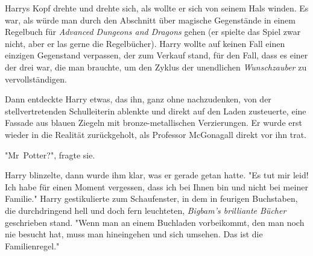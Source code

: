 Harrys Kopf drehte und drehte sich, als wollte er sich von seinem Hals winden. Es war, als würde man durch den Abschnitt über magische Gegenstände in einem Regelbuch für \emph{Advanced Dungeons and Dragons} gehen (er spielte das Spiel zwar nicht, aber er las gerne die Regelbücher). Harry wollte auf keinen Fall einen einzigen Gegenstand verpassen, der zum Verkauf stand, für den Fall, dass es einer der drei war, die man brauchte, um den Zyklus der unendlichen \emph{Wunschzauber} zu vervollständigen. 

Dann entdeckte Harry etwas, das ihn, ganz ohne nachzudenken, von der stellvertretenden Schulleiterin ablenkte und direkt auf den Laden zusteuerte, eine Fassade aus blauen Ziegeln mit bronze-metallischen Verzierungen. Er wurde erst wieder in die Realität zurückgeholt, als Professor McGonagall direkt vor ihn trat.

"Mr~Potter?", fragte sie. 

Harry blinzelte, dann wurde ihm klar, was er gerade getan hatte. "Es tut mir leid! Ich habe für einen Moment vergessen, dass ich bei Ihnen bin und nicht bei meiner Familie." Harry gestikulierte zum Schaufenster, in dem in feurigen Buchstaben, die durchdringend hell und doch fern leuchteten, \emph{Bigbam's brilliante Bücher} geschrieben stand. "Wenn man an einem Buchladen vorbeikommt, den man noch nie besucht hat, muss man hineingehen und sich umsehen. Das ist die Familienregel." 

